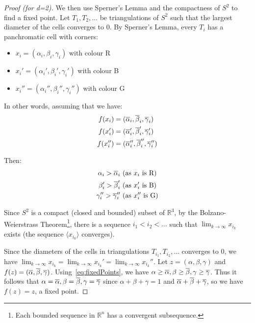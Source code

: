 \begin{proof}[Proof \emph{(for d=2)}]
		We then use Sperner's Lemma and the compactness of $S^2$ to find a
		fixed point. Let $T_1, T_2, \ldots$ be triangulations of $S^2$ such
		that the largest diameter of the cells converges to 0. By Sperner's
		Lemma, every $T_i$ has a panchromatic cell with corners:
		\begin{itemize}
			\item $x_i = (\alpha_i, \beta_i, \gamma_i)$ with colour R
			\item $x_i' = (\alpha_i', \beta_i', \gamma_i')$ with colour B
			\item $x_i'' = (\alpha_i'', \beta_i'', \gamma_i'')$ with colour G
		\end{itemize}

		In other words, assuming that we have:
		\begin{equation}
			\begin{split}
				f(x_i) & = (\overline{\alpha}_i, \overline{\beta}_i, \overline{\gamma}_i) \\
				f(x_i') & = (\overline{\alpha}_i', \overline{\beta}_i', \overline{\gamma}_i') \\
				f(x_i'') & = (\overline{\alpha}_i'', \overline{\beta}_i'', \overline{\gamma}_i'')
			\end{split}
		\end{equation}

		Then:
		\begin{equation}
			\label{eq:fixedPoints}
			\begin{split}
				\alpha_i > \overline{\alpha}_i & \text{ (as $x_i$ is R)} \\
				\beta_i' > \overline{\beta}_i' & \text{ (as $x_i'$ is B)} \\
				\gamma_i'' > \overline{\gamma}_i'' & \text{ (as $x_i''$ is G)}
			\end{split}
		\end{equation}

		Since $S^2$ is a compact (closed and bounded) subset of $\mathbb{R}^3$,
		by the Bolzano-Weierstrass Theorem\footnote{Each bounded sequence in
		$\mathbb{R}^n$ has a convergent subsequence.}, there is a sequence $i_1
		< i_2 < \ldots$ such that $\lim_{k \rightarrow \infty} x_{i_k}$ exists
		(the sequence $\langle x_{i_k} \rangle$ converges).

		Since the diameters of the cells in triangulations $T_{i_1}, T_{i_2},
		\ldots$ converges to 0, we have $\lim_{k \rightarrow \infty} x_{i_k} =
		\lim_{k \rightarrow \infty} x_{i_k}' = \lim_{k \rightarrow \infty}
		x_{i_k}''$. Let $z = (\alpha, \beta, \gamma)$ and $f(z) =
		(\overline{\alpha}, \overline{\beta}, \overline{\gamma})$.
		Using~\eqref{eq:fixedPoints}, we have $\alpha \ge \overline{\alpha}, \beta
		\ge \overline{\beta}, \gamma \ge \overline{\gamma}$. Thus it follows that
		$\alpha = \overline{\alpha}, \beta = \overline{\beta}, \gamma = \overline{\gamma}$
		since $\alpha + \beta + \gamma = 1$ and $\overline{\alpha} + \overline{\beta} +
		\overline{\gamma}$, so we have $f(z) = z$, a fixed point.
	\end{proof}

